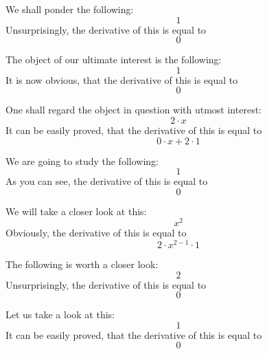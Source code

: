 \documentclass{article}
\begin{document}
We shall ponder the following:
\begin{equation}
1 
\end{equation}
Unsurprisingly, the derivative of this is equal to
\begin{equation}
0 
\end{equation}

The object of our ultimate interest is the following:
\begin{equation}
1 
\end{equation}
It is now obvious, that the derivative of this is equal to
\begin{equation}
0 
\end{equation}

One shall regard the object in question with utmost interest:
\begin{equation}
2 \cdot x 
\end{equation}
It can be easily proved, that the derivative of this is equal to
\begin{equation}
0 \cdot x + 2 \cdot 1 
\end{equation}

We are going to study the following:
\begin{equation}
1 
\end{equation}
As you can see, the derivative of this is equal to
\begin{equation}
0 
\end{equation}

We will take a closer look at this:
\begin{equation}
x ^{2 } 
\end{equation}
Obviously, the derivative of this is equal to
\begin{equation}
2 \cdot x ^{2 - 1 } \cdot 1 
\end{equation}

The following is worth a closer look:
\begin{equation}
2 
\end{equation}
Unsurprisingly, the derivative of this is equal to
\begin{equation}
0 
\end{equation}

Let us take a look at this:
\begin{equation}
1 
\end{equation}
It can be easily proved, that the derivative of this is equal to
\begin{equation}
0 
\end{equation}
\end{document}
